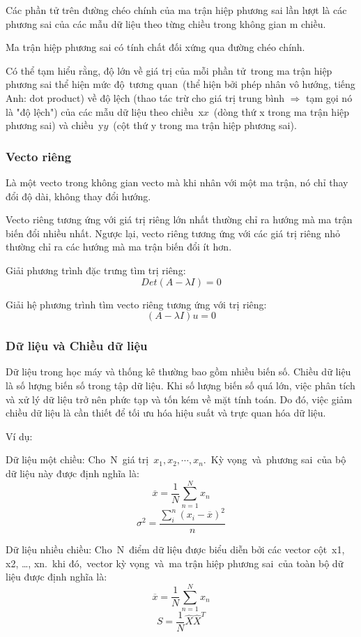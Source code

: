 \documentclass[12pt,a4paper]{article}
\begin{document}
Các phần tử trên đường chéo chính của ma trận hiệp phương sai lần lượt là các phương sai của các mẫu dữ liệu theo từng chiều trong không gian m chiều.

Ma trận hiệp phương sai có tính chất đối xứng qua đường chéo chính.

Có thể tạm hiểu rằng, độ lớn về giá trị của mỗi phần tử trong ma trận hiệp phương sai thể hiện mức độ tương quan (thể hiện bởi phép nhân vô hướng, tiếng Anh: dot product) về độ lệch (thao tác trừ cho giá trị trung bình $\Rightarrow$ tạm gọi nó là "độ lệch") của các mẫu dữ liệu theo chiều x$x$ (dòng thứ x trong ma trận hiệp phương sai) và chiều y$y$ (cột thứ y trong ma trận hiệp phương sai).
\subsubsection{Vecto riêng}

Là một vecto trong không gian vecto mà khi nhân với một ma trận, nó chỉ thay đổi độ dài, không thay đổi hướng.

Vecto riêng tương ứng với giá trị riêng lớn nhất thường chỉ ra hướng mà ma trận biến đổi nhiều nhất. Ngược lại, vecto riêng tương ứng với các giá trị riêng nhỏ thường chỉ ra các hướng mà ma trận biến đổi ít hơn. 

Giải phương trình đặc trưng tìm trị riêng: 
\[
    Det(A - \lambda I) = 0
\]

Giải hệ phương trình tìm vecto riêng tương ứng với trị riêng:
\[
    (A - \lambda I)u = 0
\]
\subsubsection{Dữ liệu và Chiều dữ liệu}
Dữ liệu trong học máy và thống kê thường bao gồm nhiều biến số. Chiều dữ liệu là số lượng biến số trong tập dữ liệu. Khi số lượng biến số quá lớn, việc phân tích và xử lý dữ liệu trở nên phức tạp và tốn kém về mặt tính toán. Do đó, việc giảm chiều dữ liệu là cần thiết để tối ưu hóa hiệu suất và trực quan hóa dữ liệu.

Ví dụ:

Dữ liệu một chiều: Cho N giá trị $x_1, x_2, \cdots, x_n$. Kỳ vọng và phương sai của bộ dữ liệu này được định nghĩa là:
\[
    \overline{x} = \frac{1}{N}\sum_{n=1}^{N} x_n
\]
\[ \sigma^2 = \frac{\sum_{i}^{n} (x_i - \overline{x})^2}{n} \]

Dữ liệu nhiều chiều: Cho N điểm dữ liệu được biểu diễn bởi các vector cột x1, x2, …, xn. khi đó, vector kỳ vọng và ma trận hiệp phương sai của toàn bộ dữ liệu được định nghĩa là:
\[ \overline{x} = \frac{1}{N}\sum_{n=1}^{N} x_n \]
\[ S = \frac{1}{N}\widehat{X} \widehat{X}^T \]
\end{document}
